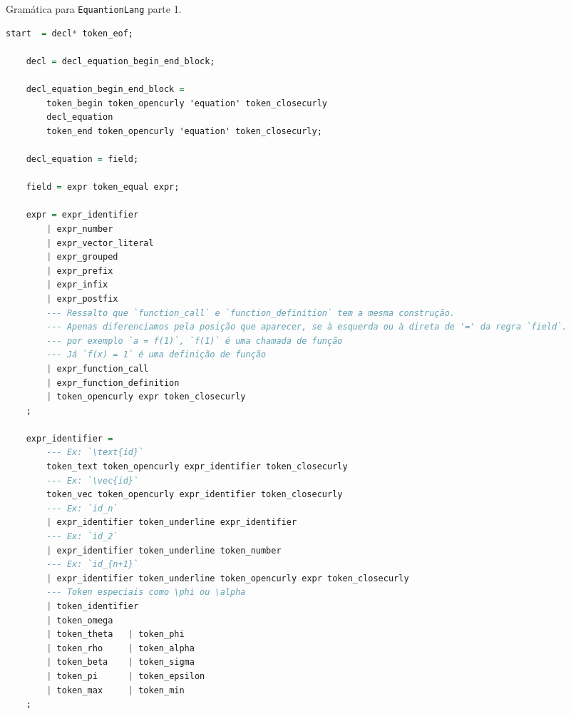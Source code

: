 \begin{codigo}[H]
        \caption{\small Gramática para \texttt{EquantionLang} parte 1.}
        \label{grammar-ast-pt1}
\begin{lstlisting}[language=haskell, numbers=none, inputencoding=utf8]
    start  = decl* token_eof;

    decl = decl_equation_begin_end_block;

    decl_equation_begin_end_block =
        token_begin token_opencurly 'equation' token_closecurly
        decl_equation
        token_end token_opencurly 'equation' token_closecurly;

    decl_equation = field;

    field = expr token_equal expr;

    expr = expr_identifier
        | expr_number
        | expr_vector_literal
        | expr_grouped
        | expr_prefix
        | expr_infix
        | expr_postfix
        --- Ressalto que `function_call` e `function_definition` tem a mesma construção.
        --- Apenas diferenciamos pela posição que aparecer, se à esquerda ou à direta de '=' da regra `field`.
        --- por exemplo `a = f(1)`, `f(1)` é uma chamada de função
        --- Já `f(x) = 1` é uma definição de função
        | expr_function_call
        | expr_function_definition
        | token_opencurly expr token_closecurly
    ;

    expr_identifier =
        --- Ex: `\text{id}`
        token_text token_opencurly expr_identifier token_closecurly
        --- Ex: `\vec{id}`
        token_vec token_opencurly expr_identifier token_closecurly
        --- Ex: `id_n`
        | expr_identifier token_underline expr_identifier
        --- Ex: `id_2`
        | expr_identifier token_underline token_number
        --- Ex: `id_{n+1}`
        | expr_identifier token_underline token_opencurly expr token_closecurly
        --- Token especiais como \phi ou \alpha
        | token_identifier
        | token_omega
        | token_theta   | token_phi
        | token_rho     | token_alpha
        | token_beta    | token_sigma
        | token_pi      | token_epsilon
        | token_max     | token_min
    ;

\end{lstlisting}
\end{codigo}

